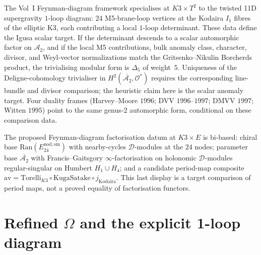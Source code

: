 \begin{remark}
\label{rem:feyn-paramodular-1loop}
The Vol~I Feynman-diagram framework specialises at $K3 \times T^2$ to the twisted
11D supergravity $1$-loop diagram: $24$ M5-brane-loop vertices at the Kodaira $I_1$
fibres of the elliptic K3, each contributing a local $1$-loop determinant. These data
define the Igusa scalar target. If the determinant descends to a scalar
automorphic factor on $\mathcal A_2$, and if the local M5 contributions, bulk
anomaly class, character, divisor, and Weyl-vector normalizations match the
Gritsenko--Nikulin Borcherds product, the trivialising modular form is
$\Delta_5$ of weight~$5$. Uniqueness of the Deligne-cohomology trivialiser in
$H^2(\overline{\mathcal A_2},\mathcal O^*)$ requires the corresponding
line-bundle and divisor comparison; the heuristic claim here is the scalar anomaly
target. Four duality frames (Harvey--Moore $1996$; DVV
$1996$--$1997$; DMVV $1997$; Witten $1995$) point to the same genus-$2$ automorphic
form, conditional on these comparison data.
\end{remark}

\begin{remark}
\label{rem:feyn-bi-based}
The proposed Feynman-diagram factorisation datum at $K3 \times E$ is bi-based: chiral base
$\mathrm{Ran}(E^{\mathrm{nod,sm}}_{24})$ with nearby-cycles $\mathcal{D}$-modules at the
$24$ nodes; parameter base $\overline{\mathcal{A}_2}$ with Francis--Gaitsgory
$\infty$-factorisation on holonomic $\mathcal{D}$-modules regular-singular on Humbert
$H_1 \cup H_4$; and a candidate period-map composite
$\mathrm{av} = \mathrm{Torelli}_{K3} \circ
\mathrm{KugaSatake} \circ j_{\mathrm{Kodaira}}$.  This last display is
a target comparison of period maps, not a proved equality of
factorisation functors.
\end{remark}

\section{Refined \texorpdfstring{$\Omega$}{Omega} and the explicit 1-loop diagram}
\label{sec:feyn-supplement-ii}

